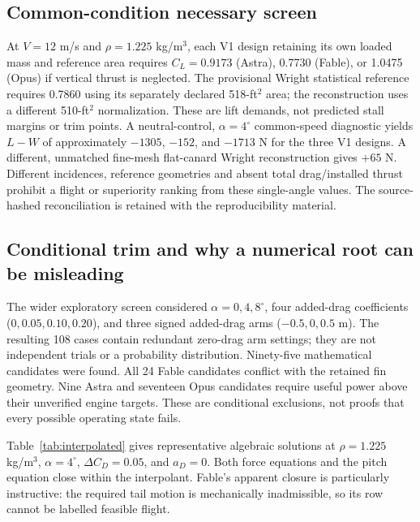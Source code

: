 \documentclass[11pt,a4paper]{article}
\begin{document}
\subsection{Common-condition necessary screen}
At $V=12$ m/s and $\rho=1.225$ kg/m$^3$, each V1 design retaining its own loaded mass and reference area requires $C_L=0.9173$ (Astra), 0.7730 (Fable), or 1.0475 (Opus) if vertical thrust is neglected. The provisional Wright statistical reference requires 0.7860 using its separately declared 518-ft$^2$ area; the reconstruction uses a different 510-ft$^2$ normalization. These are lift demands, not predicted stall margins or trim points. A neutral-control, $\alpha=4^\circ$ common-speed diagnostic yields $L-W$ of approximately $-1305$, $-152$, and $-1713$ N for the three V1 designs. A different, unmatched fine-mesh flat-canard Wright reconstruction gives $+65$ N. Different incidences, reference geometries and absent total drag/installed thrust prohibit a flight or superiority ranking from these single-angle values. The source-hashed reconciliation is retained with the reproducibility material.

\subsection{Conditional trim and why a numerical root can be misleading}
The wider exploratory screen considered $\alpha=0,4,8^\circ$, four added-drag coefficients ($0,0.05,0.10,0.20$), and three signed added-drag arms ($-0.5,0,0.5$ m). The resulting 108 cases contain redundant zero-drag arm settings; they are not independent trials or a probability distribution. Ninety-five mathematical candidates were found. All 24 Fable candidates conflict with the retained fin geometry. Nine Astra and seventeen Opus candidates require useful power above their unverified engine targets. These are conditional exclusions, not proofs that every possible operating state fails.

Table~\ref{tab:interpolated} gives representative algebraic solutions at $\rho=1.225$ kg/m$^3$, $\alpha=4^\circ$, $\Delta C_D=0.05$, and $a_D=0$. Both force equations and the pitch equation close within the interpolant. Fable's apparent closure is particularly instructive: the required tail motion is mechanically inadmissible, so its row cannot be labelled feasible flight.
\end{document}
